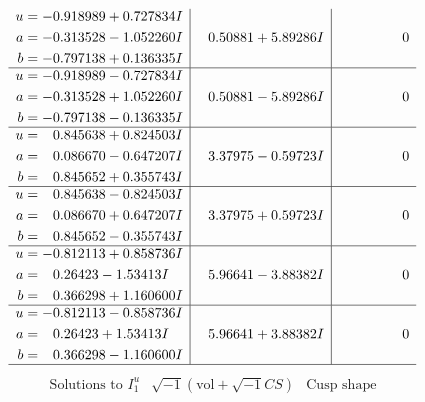 \documentclass[1p]{elsarticle_modified}
\theoremstyle{definition}
\newcommand{\I}{\sqrt{-1}}
\begin{document}
$$\begin{array}{c|c|c}
\begin{aligned}
u &= -0.918989 + 0.727834 I \\
a &= -0.313528 - 1.052260 I \\
b &= -0.797138 + 0.136335 I\end{aligned}
 & \phantom{-}0.50881 + 5.89286 I & \phantom{-0.000000 } 0 \\ \hline\begin{aligned}
u &= -0.918989 - 0.727834 I \\
a &= -0.313528 + 1.052260 I \\
b &= -0.797138 - 0.136335 I\end{aligned}
 & \phantom{-}0.50881 - 5.89286 I & \phantom{-0.000000 } 0 \\ \hline\begin{aligned}
u &= \phantom{-}0.845638 + 0.824503 I \\
a &= \phantom{-}0.086670 - 0.647207 I \\
b &= \phantom{-}0.845652 + 0.355743 I\end{aligned}
 & \phantom{-}3.37975 - 0.59723 I & \phantom{-0.000000 } 0 \\ \hline\begin{aligned}
u &= \phantom{-}0.845638 - 0.824503 I \\
a &= \phantom{-}0.086670 + 0.647207 I \\
b &= \phantom{-}0.845652 - 0.355743 I\end{aligned}
 & \phantom{-}3.37975 + 0.59723 I & \phantom{-0.000000 } 0 \\ \hline\begin{aligned}
u &= -0.812113 + 0.858736 I \\
a &= \phantom{-}0.26423 - 1.53413 I \\
b &= \phantom{-}0.366298 + 1.160600 I\end{aligned}
 & \phantom{-}5.96641 - 3.88382 I & \phantom{-0.000000 } 0 \\ \hline\begin{aligned}
u &= -0.812113 - 0.858736 I \\
a &= \phantom{-}0.26423 + 1.53413 I \\
b &= \phantom{-}0.366298 - 1.160600 I\end{aligned}
 & \phantom{-}5.96641 + 3.88382 I & \phantom{-0.000000 } 0\\
 \hline 
 \end{array}$$\newpage$$\begin{array}{c|c|c}  
\text{Solutions to }I^u_{1}& \I (\text{vol} + \sqrt{-1}CS) & \text{Cusp shape}\\

\end{array}$$
\end{document}
